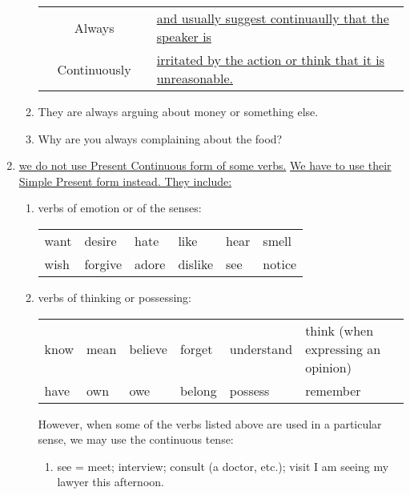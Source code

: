 \begin{enumerate}
\begin{enumerate}
\begin{tabular}{cccl}
                    & Always       & & \underline{and usually suggest continuaully that the speaker is} \\
                    & Continuously & & \underline{irritated by the action or think that it is unreasonable.}
                \end{tabular}
            \item They are always arguing about money or something else.
            \item Why are you always complaining about the food?
        \end{enumerate}
    \item \underline{we do not use Present Continuous form of some verbs.}
        \newline
        \underline{We have to use their Simple Present form instead. They include:}
        \begin{enumerate}
            \item verbs of emotion or of the senses:
                \newline
                \begin{tabular}{llllll}
                    want & desire & hate & like & hear & smell \\
                    wish & forgive & adore & dislike & see & notice
                \end{tabular}
                \newline
            \item verbs of thinking or possessing:
                \newline
                \begin{tabular}{llllll}
                    know & mean & believe & forget & understand & think (when expressing an opinion)\\
                    have & own & owe & belong & possess & remember
                \end{tabular}
                \newline
                However, when some of the verbs listed above are used in a
                particular sense, we may use the continuous tense:
                \newline
                \begin{enumerate}
                    \item see = meet; interview; consult (a doctor, etc.); visit
                        \newline
                        I am seeing my lawyer this afternoon.
                        \newline

\end{enumerate}
\end{enumerate}
\end{enumerate}
